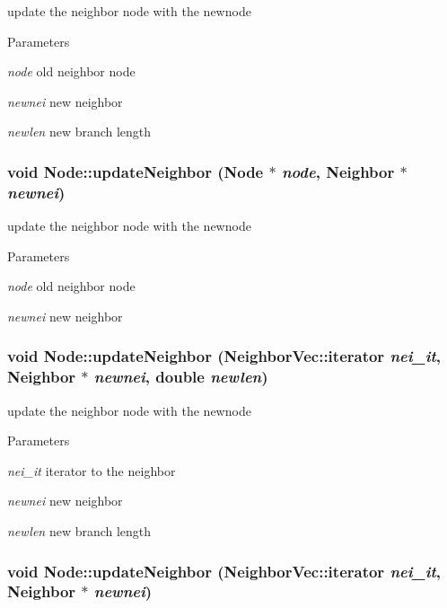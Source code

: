 \label{classNode_a0994f789ab4030889f70e5b69bcc57b3}
update the neighbor node with the newnode 
\begin{DoxyParams}{Parameters}
\item[{\em node}]old neighbor node \item[{\em newnei}]new neighbor \item[{\em newlen}]new branch length \end{DoxyParams}
\hypertarget{classNode_a7939f3acf93cb262bfea402e7c81bc87}{
\subsubsection[{updateNeighbor}]{\setlength{\rightskip}{0pt plus 5cm}void Node::updateNeighbor ({\bf Node} $\ast$ {\em node}, \/  {\bf Neighbor} $\ast$ {\em newnei})}}
\label{classNode_a7939f3acf93cb262bfea402e7c81bc87}
update the neighbor node with the newnode 
\begin{DoxyParams}{Parameters}
\item[{\em node}]old neighbor node \item[{\em newnei}]new neighbor \end{DoxyParams}
\hypertarget{classNode_a60ae4ce857e2ed5c3115060eeeec405b}{
\subsubsection[{updateNeighbor}]{\setlength{\rightskip}{0pt plus 5cm}void Node::updateNeighbor (NeighborVec::iterator {\em nei\_\-it}, \/  {\bf Neighbor} $\ast$ {\em newnei}, \/  double {\em newlen})}}
\label{classNode_a60ae4ce857e2ed5c3115060eeeec405b}
update the neighbor node with the newnode 
\begin{DoxyParams}{Parameters}
\item[{\em nei\_\-it}]iterator to the neighbor \item[{\em newnei}]new neighbor \item[{\em newlen}]new branch length \end{DoxyParams}
\hypertarget{classNode_ab45fa6addf881a2c6c090bbd9686710f}{
\subsubsection[{updateNeighbor}]{\setlength{\rightskip}{0pt plus 5cm}void Node::updateNeighbor (NeighborVec::iterator {\em nei\_\-it}, \/  {\bf Neighbor} $\ast$ {\em newnei})}}

